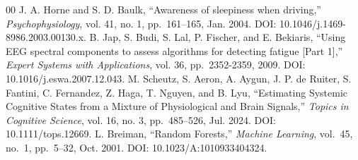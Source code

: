 \documentclass[letterpaper, 10 pt, conference]{ieeeconf}  %
\begin{document}
\begin{thebibliography}{00}
 J. A. Horne and S. D. Baulk,  
    ``Awareness of sleepiness when driving,''  
    \textit{Psychophysiology}, vol. 41, no. 1, pp.~161--165, Jan. 2004. DOI: 10.1046/j.1469-8986.2003.00130.x.
 B. Jap, S. Budi, S. Lal, P. Fischer, and E. Bekiaris,  
    ``Using EEG spectral components to assess algorithms for detecting fatigue [Part 1],''  
    \textit{Expert Systems with Applications}, vol. 36, pp.~2352-2359, 2009. DOI: 10.1016/j.eswa.2007.12.043.
 M. Scheutz, S. Aeron, A. Aygun, J. P. de Ruiter, S. Fantini, C. Fernandez, Z. Haga, T. Nguyen, and B. Lyu,  
    ``Estimating Systemic Cognitive States from a Mixture of Physiological and Brain Signals,''  
    \textit{Topics in Cognitive Science}, vol. 16, no. 3, pp.~485--526, Jul. 2024. DOI: 10.1111/tops.12669.
 L. Breiman,  
    ``Random Forests,''
    \textit{Machine Learning}, vol.~45, no.~1, pp.~5--32, Oct. 2001. DOI: 10.1023/A:1010933404324.

\end{thebibliography}
\end{document}
